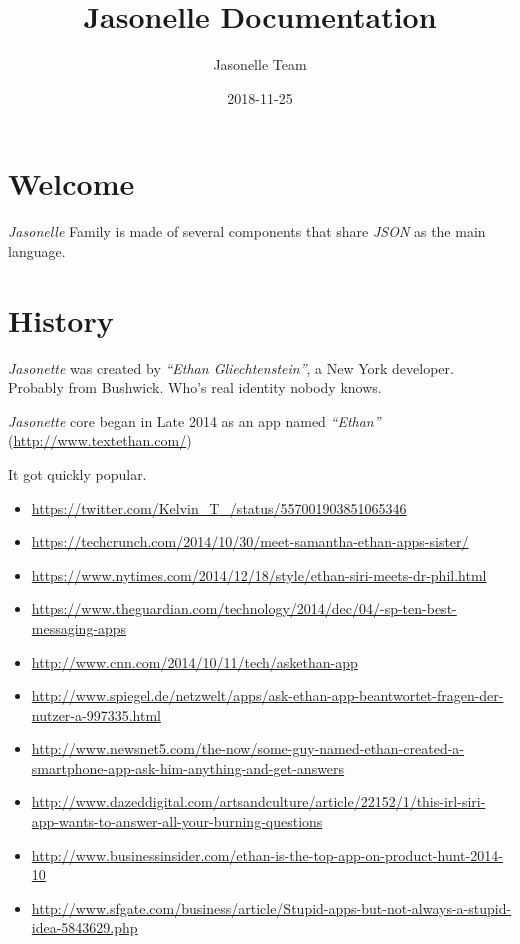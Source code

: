 \documentclass[]{book}
\title{Jasonelle Documentation}
\author{Jasonelle Team}
\date{2018-11-25}
\begin{document}
\maketitle

{
\setcounter{tocdepth}{1}
\tableofcontents
}
\hypertarget{welcome}{%
\chapter{Welcome}\label{welcome}}

\emph{Jasonelle} Family is made of several components that share
\emph{JSON} as the main language.

\hypertarget{history}{%
\chapter{History}\label{history}}

\emph{Jasonette} was created by \emph{``Ethan Gliechtenstein''}, a New
York developer. Probably from Bushwick. Who's real identity nobody
knows.

\emph{Jasonette} core began in Late 2014 as an app named
\emph{``Ethan''} (\url{http://www.textethan.com/})

It got quickly popular.

\begin{itemize}
\item
  \url{https://twitter.com/Kelvin_T_/status/557001903851065346}
\item
  \url{https://techcrunch.com/2014/10/30/meet-samantha-ethan-apps-sister/}
\item
  \url{https://www.nytimes.com/2014/12/18/style/ethan-siri-meets-dr-phil.html}
\item
  \url{https://www.theguardian.com/technology/2014/dec/04/-sp-ten-best-messaging-apps}
\item
  \url{http://www.cnn.com/2014/10/11/tech/askethan-app}
\item
  \url{http://www.spiegel.de/netzwelt/apps/ask-ethan-app-beantwortet-fragen-der-nutzer-a-997335.html}
\item
  \url{http://www.newsnet5.com/the-now/some-guy-named-ethan-created-a-smartphone-app-ask-him-anything-and-get-answers}
\item
  \url{http://www.dazeddigital.com/artsandculture/article/22152/1/this-irl-siri-app-wants-to-answer-all-your-burning-questions}
\item
  \url{http://www.businessinsider.com/ethan-is-the-top-app-on-product-hunt-2014-10}
\item
  \url{http://www.sfgate.com/business/article/Stupid-apps-but-not-always-a-stupid-idea-5843629.php}
\end{itemize}
\end{document}
